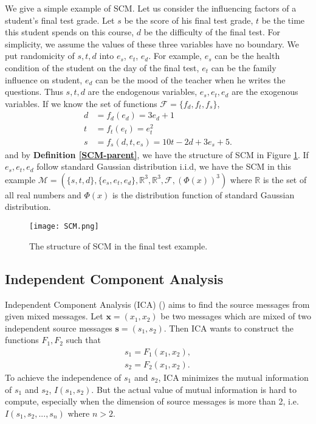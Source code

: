 \documentclass[twoside,11pt]{article}
\begin{document}
We give a simple example of SCM. Let us consider the influencing factors of a student's final test grade. Let $s$ be the score of his final test grade, $t$ be the time this student spends on this course, $d$ be the difficulty of the final test. For simplicity, we assume the values of these three variables have no boundary. 
We put randomicity of $s,t,d$ into $e_s$, $e_t$, $e_d$. For example, $e_s$ can be the health condition of the student on the day of the final test, $e_t$ can be the family influence on student, $e_d$ can be the mood of the teacher when he writes the questions. Thus $s,t,d$ are the endogenous variables, $e_s, e_t, e_d$ are the exogenous variables. 
If we know the set of functions $\mathcal F=\{f_d,f_t,f_s\}$,
\begin{align*}
d&=f_d(e_d)=3e_d+1\\
t&=f_t(e_t)=e_t^2\\
s&=f_s(d,t,e_s)=10t-2d+3e_s+5.
\end{align*}
and by \textbf{Definition \ref{SCM-parent}}, we have the structure of SCM in Figure \ref{structure SCM}. If $e_s, e_t, e_d$ follow standard Gaussian distribution i.i.d, we have the SCM in this example
$\mathcal M=\left( \{s,t,d\}, \{e_s, e_t, e_d\}, \mathbb R^3, \mathbb R^3, \mathcal F, \left(\Phi(x)\right)^3 \right)$ where $\mathbb R$ is the set of all real numbers and $\Phi(x)$ is the distribution function of standard Gaussian distribution.

\begin{figure}
\centering
\texttt{[image: SCM.png]}
\caption{The structure of SCM in the final test example.}\label{structure SCM}
\end{figure}













\subsection{Independent Component Analysis}
Independent Component Analysis (ICA) (\cite{hyvarinen2000independent}) aims to find the source messages from given mixed messages. Let $\mathbf x=(x_1,x_2)$ be two messages which are mixed of two independent source messages $\mathbf s=(s_1,s_2)$. Then ICA wants to construct the functions $F_1, F_2$ such that
\begin{align*}
    s_1=F_1(x_1,x_2),\\
    s_2=F_2(x_1,x_2).
\end{align*}
To achieve the independence of $s_1$ and $s_2$, ICA minimizes the mutual information of $s_1$ and $s_2$, $I(s_1, s_2)$. But the actual value of mutual information is hard to compute, especially when the dimension of source messages is more than 2, i.e. $I(s_1, s_2, ..., s_n)$ where $n>2$. 
\end{document}
